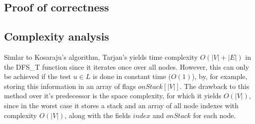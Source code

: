 \subsection{Proof of correctness}

\subsection{Complexity analysis}
Simlar to Kosaraju's algorithm, Tarjan's yields time complexity $O(|V|+|E|)$ in the DFS\_T function since it iterates once over all nodes. However, this can only be achieved if the test $u \in L$ is done in constant time ($O(1)$), by, for example, storing this information in an array of flags $onStack[|V|]$.
The drawback to this method over it's predecessor is the space complexity, for which it yields $O(|V|)$, since in the worst case it stores a stack and an array of all node indexes with complexity $O(|V|)$, along with the fields $index$ and $onStack$ for each node. 